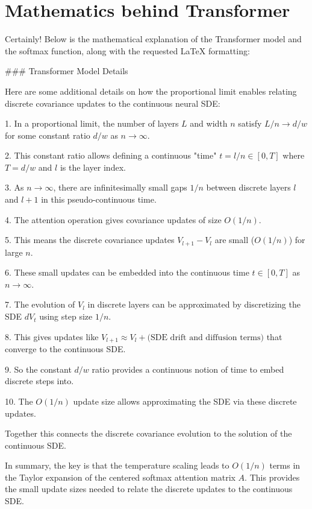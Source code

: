 \section{Mathematics behind Transformer}


Certainly! Below is the mathematical explanation of the Transformer model and the softmax function, along with the requested LaTeX formatting:

### Transformer Model Details

Here are some additional details on how the proportional limit enables relating discrete covariance updates to the continuous neural SDE:

1. In a proportional limit, the number of layers \(L\) and width \(n\) satisfy \(L/n \rightarrow d/w\) for some constant ratio \(d/w\) as \(n \rightarrow \infty\).

2. This constant ratio allows defining a continuous "time" \(t = l/n \in [0, T]\) where \(T = d/w\) and \(l\) is the layer index.

3. As \(n \rightarrow \infty\), there are infinitesimally small gaps \(1/n\) between discrete layers \(l\) and \(l+1\) in this pseudo-continuous time.

4. The attention operation gives covariance updates of size \(O(1/n)\).

5. This means the discrete covariance updates \(V_{l+1} - V_l\) are small (\(O(1/n)\)) for large \(n\).

6. These small updates can be embedded into the continuous time \(t \in [0, T]\) as \(n \rightarrow \infty\).

7. The evolution of \(V_l\) in discrete layers can be approximated by discretizing the SDE \(dV_t\) using step size \(1/n\).

8. This gives updates like \(V_{l+1} \approx V_l + \text{(SDE drift and diffusion terms)}\) that converge to the continuous SDE.

9. So the constant \(d/w\) ratio provides a continuous notion of time to embed discrete steps into.

10. The \(O(1/n)\) update size allows approximating the SDE via these discrete updates.

Together this connects the discrete covariance evolution to the solution of the continuous SDE.

In summary, the key is that the temperature scaling leads to \(O(1/n)\) terms in the Taylor expansion of the centered softmax attention matrix \(A\). This provides the small update sizes needed to relate the discrete updates to the continuous SDE.

